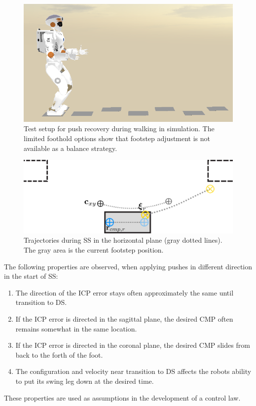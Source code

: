 \begin{figure}[h]
\centering
  \includegraphics[width=.8\linewidth]{STYLESTUFF/valwalkingtest.png}
   \caption{Test setup for push recovery during walking in simulation. The limited foothold options show that footstep adjustment is not available as a balance strategy.}
    \label{fig:valwalkingtest}
\end{figure}
\begin{figure}[h]
\centering
  \includegraphics[width=.8\linewidth]{STYLESTUFF/ICPplan3StepComICPrSS.png}
   \caption{Trajectories during \ac{SS} in the horizontal plane (gray dotted lines). The gray area is the current footstep position.}
    \label{fig:3foot}
\end{figure}

The following properties are observed, when applying pushes in different direction in the start of \ac{SS}:
\begin{enumerate}
	\item The direction of the \ac{ICP} error stays often approximately the same until transition to \ac{DS}.
	\item If the \ac{ICP} error is directed in the sagittal plane, the desired \ac{CMP} often remains somewhat in the same location.
	\item If the \ac{ICP} error is directed  in the coronal plane, the desired \ac{CMP} slides from back to the forth of the foot.
	\item The configuration and velocity near transition to \ac{DS} affects the robots ability to put its swing leg down at the desired time. 
\end{enumerate}
These properties are used as assumptions in the development of a control law.
